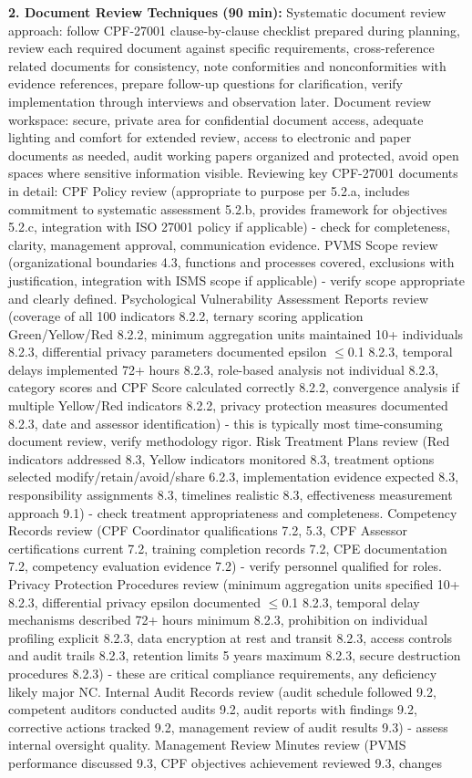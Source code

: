 \documentclass[11pt,a4paper]{article}
\begin{document}
\textbf{2. Document Review Techniques (90 min):} Systematic document review approach: follow CPF-27001 clause-by-clause checklist prepared during planning, review each required document against specific requirements, cross-reference related documents for consistency, note conformities and nonconformities with evidence references, prepare follow-up questions for clarification, verify implementation through interviews and observation later. Document review workspace: secure, private area for confidential document access, adequate lighting and comfort for extended review, access to electronic and paper documents as needed, audit working papers organized and protected, avoid open spaces where sensitive information visible. Reviewing key CPF-27001 documents in detail: CPF Policy review (appropriate to purpose per 5.2.a, includes commitment to systematic assessment 5.2.b, provides framework for objectives 5.2.c, integration with ISO 27001 policy if applicable) - check for completeness, clarity, management approval, communication evidence. PVMS Scope review (organizational boundaries 4.3, functions and processes covered, exclusions with justification, integration with ISMS scope if applicable) - verify scope appropriate and clearly defined. Psychological Vulnerability Assessment Reports review (coverage of all 100 indicators 8.2.2, ternary scoring application Green/Yellow/Red 8.2.2, minimum aggregation units maintained 10+ individuals 8.2.3, differential privacy parameters documented epsilon $\leq$0.1 8.2.3, temporal delays implemented 72+ hours 8.2.3, role-based analysis not individual 8.2.3, category scores and CPF Score calculated correctly 8.2.2, convergence analysis if multiple Yellow/Red indicators 8.2.2, privacy protection measures documented 8.2.3, date and assessor identification) - this is typically most time-consuming document review, verify methodology rigor. Risk Treatment Plans review (Red indicators addressed 8.3, Yellow indicators monitored 8.3, treatment options selected modify/retain/avoid/share 6.2.3, implementation evidence expected 8.3, responsibility assignments 8.3, timelines realistic 8.3, effectiveness measurement approach 9.1) - check treatment appropriateness and completeness. Competency Records review (CPF Coordinator qualifications 7.2, 5.3, CPF Assessor certifications current 7.2, training completion records 7.2, CPE documentation 7.2, competency evaluation evidence 7.2) - verify personnel qualified for roles. Privacy Protection Procedures review (minimum aggregation units specified 10+ 8.2.3, differential privacy epsilon documented $\leq$0.1 8.2.3, temporal delay mechanisms described 72+ hours minimum 8.2.3, prohibition on individual profiling explicit 8.2.3, data encryption at rest and transit 8.2.3, access controls and audit trails 8.2.3, retention limits 5 years maximum 8.2.3, secure destruction procedures 8.2.3) - these are critical compliance requirements, any deficiency likely major NC. Internal Audit Records review (audit schedule followed 9.2, competent auditors conducted audits 9.2, audit reports with findings 9.2, corrective actions tracked 9.2, management review of audit results 9.3) - assess internal oversight quality. Management Review Minutes review (PVMS performance discussed 9.3, CPF objectives achievement reviewed 9.3, changes 
\end{document}
